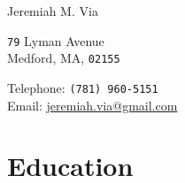\documentclass[10pt, letter]{article}
\begin{document}
{\LARGE Jeremiah M. Via}\\[1cm]
\begin{minipage}[t]{0.55\textwidth}
  \texttt{79} Lyman Avenue\\
  Medford, MA, \texttt{02155}\\
\end{minipage}
\begin{minipage}[t]{0.4\textwidth}
  Telephone: \texttt{(781) 960-5151}\\
  Email: \href{mailto:jeremiah.via@gmail.com}{jeremiah.via@gmail.com}\\
\end{minipage}



\section*{Education}
\end{document}
